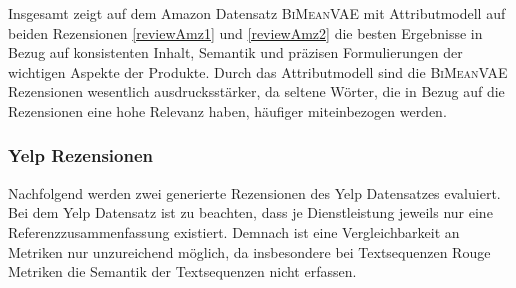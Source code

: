 
Insgesamt zeigt auf dem Amazon Datensatz \textsc{BiMeanVAE} mit Attributmodell auf beiden Rezensionen \ref{reviewAmz1} und \ref{reviewAmz2} die besten Ergebnisse in Bezug auf konsistenten Inhalt, Semantik und präzisen Formulierungen der wichtigen Aspekte der Produkte.
Durch das Attributmodell sind die \textsc{BiMeanVAE} Rezensionen wesentlich ausdrucksstärker, da seltene Wörter, die in Bezug auf die Rezensionen eine hohe Relevanz haben, häufiger miteinbezogen werden.

\pagebreak
\subsubsection{Yelp Rezensionen} %
Nachfolgend werden zwei generierte Rezensionen des Yelp Datensatzes evaluiert. 
Bei dem Yelp Datensatz ist zu beachten, dass je Dienstleistung jeweils nur eine Referenzzusammenfassung existiert.
Demnach ist eine Vergleichbarkeit an Metriken nur unzureichend möglich, da insbesondere bei Textsequenzen Rouge Metriken die Semantik der Textsequenzen nicht erfassen.

